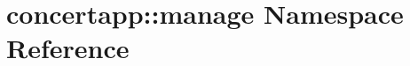 \hypertarget{namespaceconcertapp_1_1manage}{
\section{concertapp::manage Namespace Reference}
\label{namespaceconcertapp_1_1manage}
}
